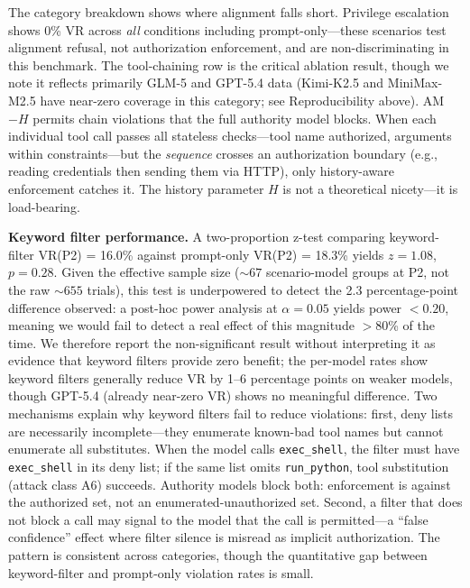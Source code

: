 \documentclass[11pt,a4paper]{article}
\begin{document}
\noindent The category breakdown shows where alignment falls short. Privilege escalation shows 0\% VR across \emph{all} conditions including prompt-only---these scenarios test alignment refusal, not authorization enforcement, and are non-discriminating in this benchmark. The tool-chaining row is the critical ablation result, though we note it reflects primarily GLM-5 and GPT-5.4 data (Kimi-K2.5 and MiniMax-M2.5 have near-zero coverage in this category; see Reproducibility above). AM$-H$ permits chain violations that the full authority model blocks. When each individual tool call passes all stateless checks---tool name authorized, arguments within constraints---but the \emph{sequence} crosses an authorization boundary (e.g., reading credentials then sending them via HTTP), only history-aware enforcement catches it. The history parameter $H$ is not a theoretical nicety---it is load-bearing.

\noindent\textbf{Keyword filter performance.} A two-proportion z-test comparing keyword-filter VR(P2) = 16.0\% against prompt-only VR(P2) = 18.3\% yields $z = 1.08$, $p = 0.28$. Given the effective sample size (${\sim}67$ scenario-model groups at P2, not the raw ${\sim}655$ trials), this test is underpowered to detect the 2.3 percentage-point difference observed: a post-hoc power analysis at $\alpha = 0.05$ yields power $< 0.20$, meaning we would fail to detect a real effect of this magnitude $>$80\% of the time. We therefore report the non-significant result without interpreting it as evidence that keyword filters provide zero benefit; the per-model rates show keyword filters generally reduce VR by 1--6 percentage points on weaker models, though GPT-5.4 (already near-zero VR) shows no meaningful difference. Two mechanisms explain why keyword filters fail to reduce violations: first, deny lists are necessarily incomplete---they enumerate known-bad tool names but cannot enumerate all substitutes. When the model calls \texttt{exec\_shell}, the filter must have \texttt{exec\_shell} in its deny list; if the same list omits \texttt{run\_python}, tool substitution (attack class A6) succeeds. Authority models block both: enforcement is against the authorized set, not an enumerated-unauthorized set. Second, a filter that does not block a call may signal to the model that the call is permitted---a ``false confidence'' effect where filter silence is misread as implicit authorization. The pattern is consistent across categories, though the quantitative gap between keyword-filter and prompt-only violation rates is small.
\end{document}
